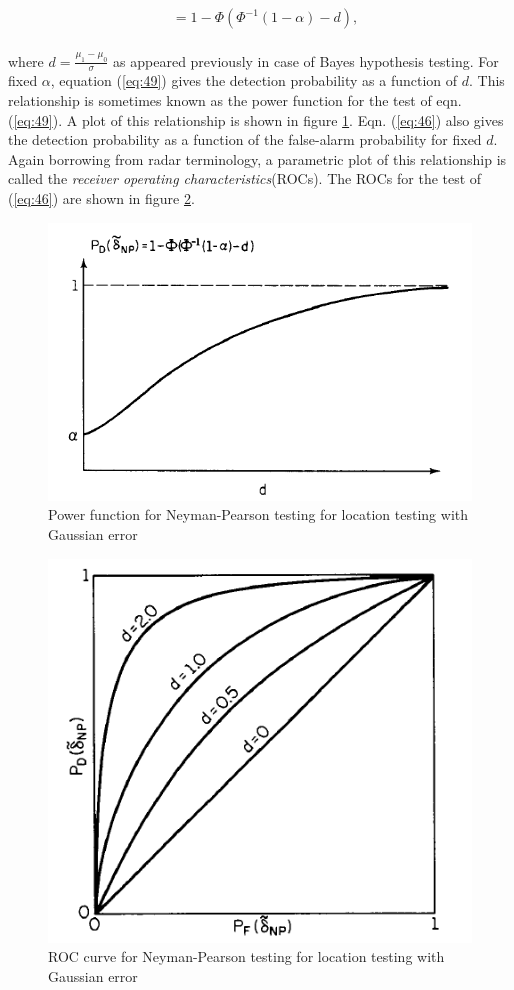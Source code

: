 \documentclass[a4paper,english,12pt]{article}
\begin{document}
\begin{exmp}
\begin{align}
					  &=1-\Phi(\Phi^{-1}(1-\alpha)-d),
\end{align}\\
where $d=\frac{\mu_{1}-\mu_{0}}{\sigma}$ as appeared previously in case of Bayes hypothesis testing. For fixed $\alpha$, equation (\ref{eq:49}) gives the detection probability as a function of $d$. This relationship is sometimes known as the power function for the test of eqn. (\ref{eq:49}). A plot of this relationship is shown in figure \ref{fig:Power}. Eqn. (\ref{eq:46}) also gives the detection probability as a function of the false-alarm probability for fixed $d$. Again borrowing from radar terminology, a parametric plot of this relationship is called the \textit{receiver operating characteristics}(ROCs). The ROCs for the test of (\ref{eq:46}) are shown in figure \ref{fig:ROC}.
\begin{figure}[h]
\centering
\includegraphics[width=0.5\linewidth]{Figures/Power}
\caption{Power function for Neyman-Pearson testing for location testing with Gaussian error}
\label{fig:Power}
\end{figure}
\begin{figure}[h]
\centering
\includegraphics[width=0.5\linewidth]{Figures/ROC}
\caption{ROC curve for Neyman-Pearson testing for location testing with Gaussian error}
\label{fig:ROC}
\end{figure}
\end{exmp}
\end{document}
